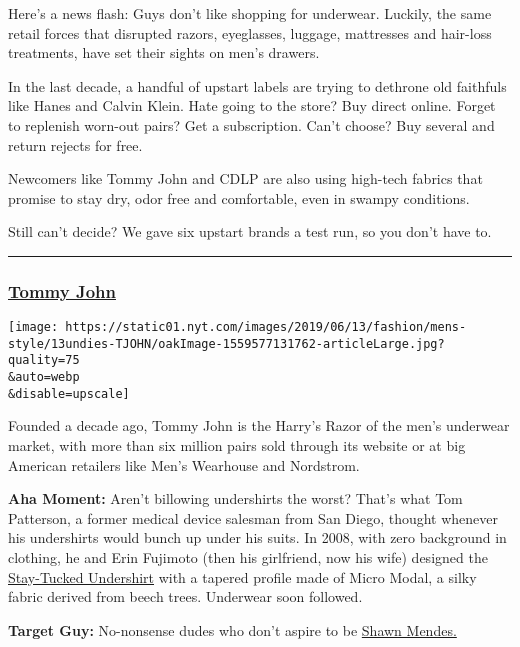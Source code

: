 Here's a news flash: Guys don't like shopping for underwear. Luckily,
the same retail forces that disrupted razors, eyeglasses, luggage,
mattresses and hair-loss treatments, have set their sights on men's
drawers.

In the last decade, a handful of upstart labels are trying to dethrone
old faithfuls like Hanes and Calvin Klein. Hate going to the store? Buy
direct online. Forget to replenish worn-out pairs? Get a subscription.
Can't choose? Buy several and return rejects for free.

Newcomers like Tommy John and CDLP are also using high-tech fabrics that
promise to stay dry, odor free and comfortable, even in swampy
conditions.

Still can't decide? We gave six upstart brands a test run, so you don't
have to.

\begin{center}\rule{0.5\linewidth}{\linethickness}\end{center}

\hypertarget{tommy-john}{%
\subsubsection{\texorpdfstring{\href{https://tommyjohn.com/}{Tommy
John}}{Tommy John}}\label{tommy-john}}

\texttt{[image: https://static01.nyt.com/images/2019/06/13/fashion/mens-style/13undies-TJOHN/oakImage-1559577131762-articleLarge.jpg?quality=75\\\&auto=webp\\\&disable=upscale]}

Founded a decade ago, Tommy John is the Harry's Razor of the men's
underwear market, with more than six million pairs sold through its
website or at big American retailers like Men's Wearhouse and Nordstrom.

\textbf{Aha Moment:} Aren't billowing undershirts the worst? That's what
Tom Patterson, a former medical device salesman from San Diego, thought
whenever his undershirts would bunch up under his suits. In 2008, with
zero background in clothing, he and Erin Fujimoto (then his girlfriend,
now his wife) designed the
\href{https://tommyjohn.com/products/second-skin-crew-neck-stay-tucked-undershirt-2-0}{Stay-Tucked
Undershirt} with a tapered profile made of Micro Modal, a silky fabric
derived from beech trees. Underwear soon followed.

\textbf{Target Guy:} No-nonsense dudes who don't aspire to be
\href{https://www.youtube.com/watch?v=5PZjo7tpb1w}{Shawn Mendes.}

